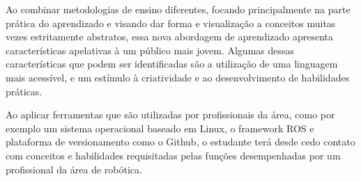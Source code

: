 Ao combinar metodologias de ensino diferentes, focando principalmente na parte prática do aprendizado e visando dar forma e visualização a conceitos muitas vezes estritamente abstratos, essa nova abordagem de aprendizado apresenta características apelativas à um público mais jovem. Algumas dessas características que podem ser identificadas são a utilização de uma linguagem mais acessível, e um estímulo à criatividade e ao desenvolvimento de habilidades práticas.

Ao aplicar ferramentas que são utilizadas por profissionais da área, como por exemplo um sistema operacional baseado em Linux, o framework ROS e plataforma de versionamento como o Github, o estudante terá desde cedo contato com conceitos e habilidades requisitadas pelas funções desempenhadas por um profissional da área de robótica.